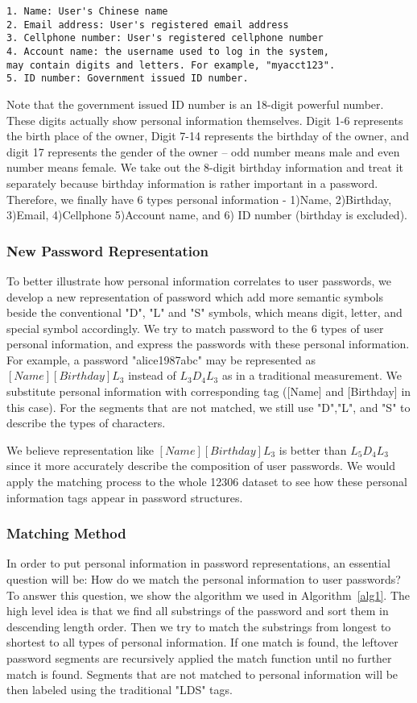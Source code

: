 \begin{verbatim}
1. Name: User's Chinese name
2. Email address: User's registered email address
3. Cellphone number: User's registered cellphone number
4. Account name: the username used to log in the system, 
may contain digits and letters. For example, "myacct123".
5. ID number: Government issued ID number.
\end{verbatim}

Note that the government issued ID number is an 18-digit powerful number. These digits actually show personal information themselves. Digit 1-6 represents the birth place of the owner, Digit 7-14 represents the birthday of the owner, and digit 17 represents the gender of the owner -- odd number means male and even number means female. We take out the 8-digit birthday information and treat it separately because birthday information is rather important in a password. Therefore, we finally have 6 types personal information - 1)Name, 2)Birthday, 3)Email, 4)Cellphone 5)Account name, and 6) ID number (birthday is excluded). 

\subsubsection{New Password Representation}
To better illustrate how personal information correlates to user passwords, we develop a new representation of password which add more semantic symbols beside the conventional "D", "L" and "S" symbols, which means digit, letter, and special symbol accordingly. We try to match password to the 6 types of user personal information, and express the passwords with these personal information. For example, a password "alice1987abc" may be represented as $[Name][Birthday]L_3$ instead of $L_3D_4L_3$ as in a traditional measurement. We substitute personal information with corresponding tag ([Name] and [Birthday] in this case). For the segments that are not matched, we still use "D","L", and "S" to describe the types of characters.

We believe representation like $[Name][Birthday]L_3$ is better than $L_5D_4L_3$ since it more accurately describe the composition of user passwords. We would apply the matching process to the whole 12306 dataset to see how these personal information tags appear in password structures.

\subsubsection{Matching Method}
\label{matchingmethod}
In order to put personal information in password representations, an essential question will be: How do we match the personal information to user passwords? To answer this question, we show the algorithm we used in Algorithm~\ref{alg1}. The high level idea is that we find all substrings of the password and sort them in descending length order. Then we try to match the substrings from longest to shortest to all types of personal information. If one match is found, the leftover password segments are recursively applied the match function until no further match is found. Segments that are not matched to personal information will be then labeled using the traditional "LDS" tags.


